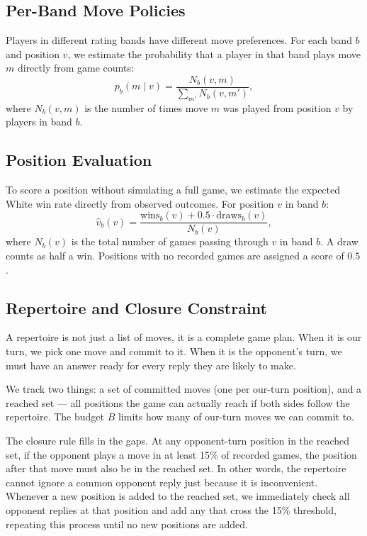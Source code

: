 \documentclass[conference]{IEEEtran}
\begin{document}
\subsection{Per-Band Move Policies}

Players in different rating bands have different move preferences. For each band $b$ and position $v$, we estimate the probability that a player in that band plays move $m$ directly from game counts:
\begin{equation}
p_b(m \mid v) = \frac{N_b(v, m)}{\displaystyle\sum_{m'} N_b(v, m')},
\label{eq:policy}
\end{equation}
where $N_b(v, m)$ is the number of times move $m$ was played from position $v$ by players in band $b$.

\subsection{Position Evaluation}

To score a position without simulating a full game, we estimate the expected White win rate directly from observed outcomes. For position $v$ in band $b$:
\begin{equation}
\hat{v}_b(v) = \frac{\text{wins}_b(v) + 0.5 \cdot \text{draws}_b(v)}{N_b(v)},
\label{eq:eval}
\end{equation}
where $N_b(v)$ is the total number of games passing through $v$ in band $b$. A draw counts as half a win. Positions with no recorded games are assigned a score of $0.5$.

\subsection{Repertoire and Closure Constraint}

A repertoire is not just a list of moves, it is a complete game plan. When it is our turn, we pick one move and commit to it. When it is the opponent's turn, we must have an answer ready for every reply they are likely to make.

We track two things: a set of committed moves (one per our-turn position), and a reached set --- all positions the game can actually reach if both sides follow the repertoire. The budget $B$ limits how many of our-turn moves we can commit to.

The closure rule fills in the gaps. At any opponent-turn position in the reached set, if the opponent plays a move in at least 15\% of recorded games, the position after that move must also be in the reached set. In other words, the repertoire cannot ignore a common opponent reply just because it is inconvenient. Whenever a new position is added to the reached set, we immediately check all opponent replies at that position and add any that cross the 15\% threshold, repeating this process until no new positions are added.
\end{document}
